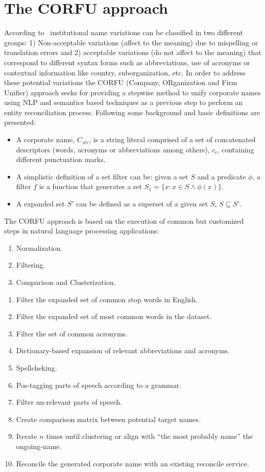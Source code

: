 \documentclass{llncs}
\begin{document}
 \section{The CORFU approach}
According to~\cite{Galvez2006,Morillo:2013:TAA:2424697.2424727} institutional name variations can be 
classified in two different groups: 1) Non-acceptable variations (affect to the meaning) due to mispelling or translation errors and 
2) acceptable variations (do not affect to the meaning) that correspond to different syntax forms such as abbreviations, use of acronyms or contextual 
information like country, suborganization, etc. In order to address these potential variations the CORFU (Company, ORganization and Firm Unifier) approach 
seeks for providing a stepwise method to unify corporate names using NLP and semantics based techniques as a previous step to perform 
an entity reconciliation process. Following some background and basic definitions are presented: 
\begin{itemize}
 \item A corporate name, $C_{str}$, is a string literal comprised of a set of concatenated descriptors (words, acronyms or abbreviations among others), $c_i$, 
containing different punctuation marks. 
\item A simplistic definition of a set filter can be: given a set $S$ and a predicate $\phi$, a filter $f$ is a function that generates 
a set $S_1 = \{ x : x \in S \wedge \phi (x)\}$.
\item A expanded set $S'$ can be defined as a superset of a given set $S$, $S \subseteq S'$.
\end{itemize}

The CORFU approach is based on the execution of common but customized steps in natural language processing applications:
\begin{enumerate}
 \item Normalization.
 \item Filtering.
 \item Comparison and Clusterization.
\end{enumerate}

\begin{enumerate}
 \item Filter the expanded set of common stop words in English.
 \item Filter the expanded set of most common words in the dataset.
 \item Filter the set of common acronyms.
 \item Dictionary-based expansion of relevant abbreviations and acronyms.
 \item Spellcheking.
 \item Pos-tagging parts of speech according to a grammar.
 \item Filter un-relevant parts of speech.
 \item Create comparison matrix between potential target names.
 \item Iterate $n$ times until clustering or align with ``the most probably name'' the ongoing-name.
 \item Reconcile the generated corporate name with an existing reconcile service.
\end{enumerate}
\end{document}
